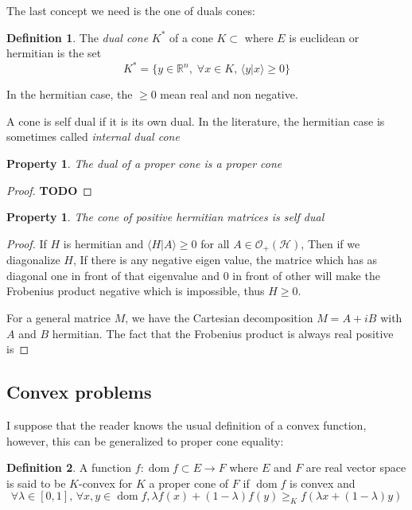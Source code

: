 \documentclass[10pt]{report}
\theoremstyle{plain}
\newtheorem{prop}[thm]{Property}
\theoremstyle{definition}
\newtheorem{defn}{Definition}[chapter]
\theoremstyle{remark}
\newcommand{\R}{\ensuremath{\mathbb{R}}}
\newcommand{\TODO}{\textbf{TODO}}
\newcommand{\braket}[2]{\langle#1|#2\rangle}
\renewcommand{\geq}{\geqslant}
\DeclareMathOperator{\dom}{dom}
\begin{document}
The last concept we need is the one of duals cones:

\begin{defn}
  The \emph{dual cone} $K^*$ of a cone $K \subset$ where $E$ is euclidean or hermitian is the set
  \[ K^* = \{y \in \R^n,\; \forall x \in K,\, \braket y x \geq 0\}\]

  In the hermitian case, the $\geq 0$ mean real and non negative.
\end{defn}

A cone is self dual if it is its own dual. In the literature, the hermitian case
is sometimes called \emph{internal dual cone}

\begin{prop}
  The dual of a proper cone is a proper cone
\end{prop}

\begin{proof}
  \TODO{}
\end{proof}

\begin{prop}
  The cone of positive hermitian matrices is self dual
\end{prop}

\begin{proof}
  If $H$ is hermitian and $\langle H | A \rangle \geq 0$ for all $A \in
  \mathcal{O}_+(\mathcal{H})$, Then if we diagonalize $H$, If there is any
  negative eigen value, the matrice which has as diagonal one in front of that
  eigenvalue and 0 in front of other will make the Frobenius product negative
  which is impossible, thus $H \geq 0$.

  For a general matrice $M$, we have the Cartesian decomposition $M = A + iB$
  with $A$ and $B$ hermitian. The fact that the Frobenius product is always real positive is

\end{proof}


\subsection{Convex problems}

I suppose that the reader knows the usual definition of a convex function,
however, this can be generalized to proper cone equality:

\begin{defn}
  A function $f : \dom f \subset E \to F$ where $E$ and $F$ are real vector
  space is said to be $K$-convex for $K$ a proper cone of $F$ if $\dom f$ is
  convex and
  \[\forall \lambda \in [0,1],\, \forall x,y \in \dom f, \lambda f(x) + (1 -
    \lambda)f(y) \geq_K f(\lambda x + (1-\lambda)y)\]
\end{defn}
\end{document}

